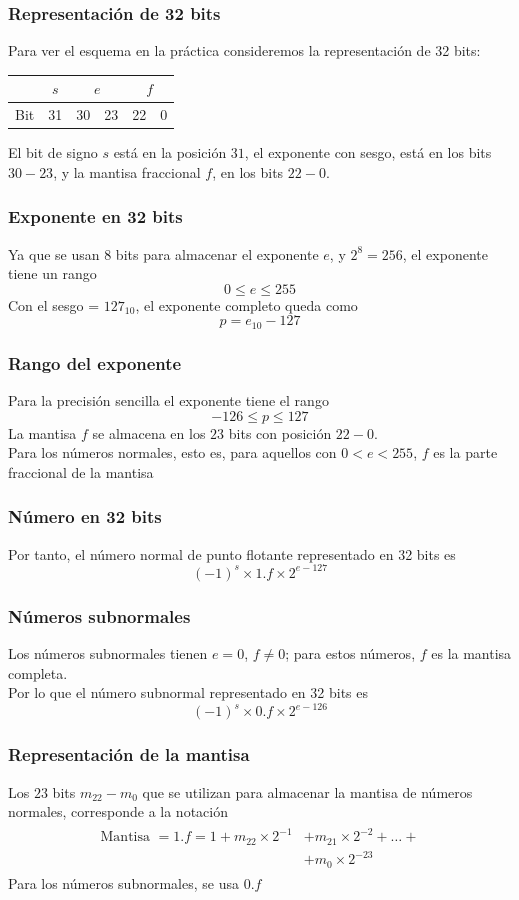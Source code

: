 \begin{frame}
\frametitle{Representación de 32 bits}
Para ver el esquema en la práctica consideremos la representación de 32 bits:
\begin{table}
\fontsize{12}{12}\selectfont
\begin{tabular}{l | c | c | c | c | c|}
\cline{2-6}
 {} & $s$ & \multicolumn{2}{c|}{$e$} & \multicolumn{2}{c|}{$f$} \\ \hline
 Bit & 31 & 30 & 23 & 22 & 0 \\ \hline
\end{tabular}
\end{table}
\pause
El bit de signo $s$ está en la posición $31$, el exponente con sesgo, está en los bits $30-23$, y la mantisa fraccional $f$, en los bits $22 - 0$.
\end{frame}
\begin{frame}
\frametitle{Exponente en 32 bits}
Ya que se usan $8$ bits para almacenar el exponente $e$, y $2^{8} = 256$, el exponente tiene un rango
\[ 0 \leq e \leq 255 \]
\pause
Con el sesgo = $127_{10}$, el exponente completo queda como
\[ p = e_{10} - 127 \]
\end{frame}
\begin{frame}
\frametitle{Rango del exponente}
Para la precisión sencilla el exponente tiene el rango
\[ -126 \leq p \leq 127 \]
La mantisa $f$ se almacena en los $23$ bits con posición $22-0$. 
\\
\bigskip
Para los números normales, esto es, para aquellos con $0 < e < 255$, $f$ es la parte fraccional de la mantisa
\end{frame}
\begin{frame}
\frametitle{Número en 32 bits}
Por tanto, el número normal de punto flotante representado en 32 bits es
\[ (-1)^{s} \times 1.f \times 2^{e-127} \]
\end{frame}
\begin{frame}
\frametitle{Números subnormales}
Los números subnormales tienen $e=0$, $f \neq 0$; para estos números, $f$ es la mantisa completa.
\\
\bigskip
Por lo que el número subnormal representado en 32 bits es
\begin{equation}
(-1)^{s} \times 0.f \times 2^{e-126}
\label{eq:ecuacion_01_04}
\end{equation}
\end{frame}
\begin{frame}
\frametitle{Representación de la mantisa}
Los $23$ bits $m_{22} - m_{0}$ que se utilizan para almacenar la mantisa de números normales, corresponde a la notación
\begin{align}
\begin{aligned}
\text{Mantisa } = 1.f = 1 + m_{22} \times 2^{-1} &+ m_{21} \times 2^{-2} + \ldots + \\
&+ m_{0} \times 2^{-23}
\end{aligned}
\label{eq:ecuacion_01_05}
\end{align}
\pause
Para los números subnormales, se usa $0.f$
\end{frame}
